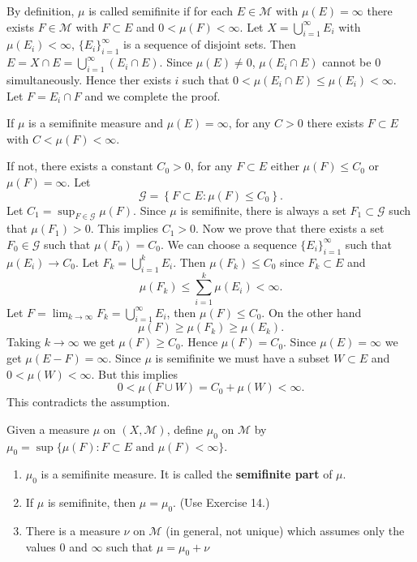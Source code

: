 \begin{sol}
  By definition,  $\mu$ is called semifinite if for each $E\in \mathcal{M}$ with $\mu\left( E \right) =\infty$ there exists $F\in \mathcal{M}$ with $F\subset E$ and $0<\mu\left( F \right) <\infty$. Let $X=\bigcup_{i=1} ^{\infty}E_i$ with $\mu\left( E_i \right)<\infty $, $\{E_i\} _{i=1}^{\infty}$ is a sequence of disjoint sets. Then $E=X\cap E=\bigcup_{i=1} ^{\infty}\left( E_i\cap E \right) $. Since $\mu\left( E \right) \neq 0$, $\mu\left( E_i\cap E \right) $ cannot be $0$ simultaneously. Hence ther exists  $i$ such that $0<\mu\left( E_i\cap E \right) \le \mu\left( E_i \right) <\infty$. Let $F=E_{i}\cap F$ and we complete the proof.
\end{sol}
\begin{exe}
  If $\mu$ is a semifinite measure and $\mu\left( E \right) =\infty$, for any $C>0$ there exists $F\subset E$ with $C<\mu\left( F \right) <\infty$.
\end{exe}
\begin{sol}
  If not, there exists a constant $C_0>0$, for any  $F\subset E$  either  $\mu\left( F \right) \le C_0$ or $\mu\left( F \right) =\infty$. Let
  \[
  \mathcal{G}=\left\{ F\subset E:\mu\left( F \right) \leq C_0 \right\} 
  .\]
  Let $C_1=\sup_{F\in \mathcal{G}}\mu\left( F \right) $. Since $\mu$ is semifinite, there is always a set $F_1\subset \mathcal{G}$ such that $\mu\left( F_1 \right)>0 $. This implies $C_1>0$. Now we prove that there exists a set  $F_0\in \mathcal{G}$ such that $\mu\left( F_0 \right)=C_0 $. We can choose a sequence $\{E_i\} _{i=1}^{\infty}$ such that $\mu\left( E_i \right) \to C_0$. Let $F_k=\bigcup_{i=1} ^{k}E_i$. Then $\mu\left( F_k \right) \le C_0$ since $F_k\subset E$ and 
  \[
  \mu\left( F_k \right) \le \sum_{i=1}^{k}\mu\left( E_i \right) <\infty
  .\] 
  Let $F=\lim_{k\to \infty}F_k=\bigcup_{i=1} ^{\infty}E_i$, then $\mu\left( F \right)\le C_0 $. On the other hand
  \[
  \mu\left( F \right)\ge \mu\left( F_k \right)\ge \mu\left( E_k \right)   
  .\] 
  Taking $k\to \infty$ we get $\mu\left( F \right) \ge C_0$. Hence $\mu\left( F \right) =C_0$.
  Since  $\mu\left( E \right) =\infty$ we get $\mu\left( E-F \right) =\infty$. Since $\mu$ is semifinite we must have a subset $W\subset E $ and $0<\mu\left( W \right) <\infty$. But this implies
  \[
  0<\mu\left( F\cup W \right) =C_0+\mu\left( W \right) <\infty
  .\] 
  This contradicts the assumption.
\end{sol}
\begin{exe}
  Given a measure $\mu$ on $\left( X,\mathcal{M} \right) $, define $\mu_0$ on $\mathcal{M}$ by $\mu_0=\sup \{\mu\left( F \right) :F\subset E \text{ and }\mu\left( F \right) <\infty\} $.
  \begin{enumerate}
    \item $\mu_0$ is a semifinite measure. It is called the \textbf{semifinite part} of $\mu$.
    \item If $\mu$ is semifinite, then $\mu=\mu_0$. (Use Exercise 14.)
    \item There is a measure $\nu$ on $\mathcal{M}$ (in general, not unique) which assumes only the values $0$ and $\infty$ such that $\mu=\mu_0+\nu$
  \end{enumerate}
\end{exe}
